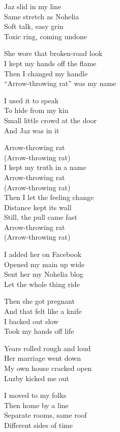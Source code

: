 \begin{lyrics}

Jaz slid in my line\\
Same stretch as Nohelia\\
Soft talk, easy grin\\
Toxic ring, coming undone

She wore that broken-road look\\
I kept my hands off the flame\\
Then I changed my handle\\
“Arrow-throwing rat” was my name

I used it to speak\\
To hide from my kin\\
Small little crowd at the door\\
And Jaz was in it

Arrow-throwing rat\\
(Arrow-throwing rat)\\
I kept my truth in a name\\
Arrow-throwing rat\\
(Arrow-throwing rat)\\
Then I let the feeling change\\
Distance kept its wall\\
Still, the pull came fast\\
Arrow-throwing rat\\
(Arrow-throwing rat)

I added her on Facebook\\
Opened my main up wide\\
Sent her my Nohelia blog\\
Let the whole thing ride

Then she got pregnant\\
And that felt like a knife\\
I backed out slow\\
Took my hands off life

Years rolled rough and loud\\
Her marriage went down\\
My own house cracked open\\
Luzby kicked me out

I moved to my folks\\
Then home by a line\\
Separate rooms, same roof\\
Different sides of time


\end{lyrics}
